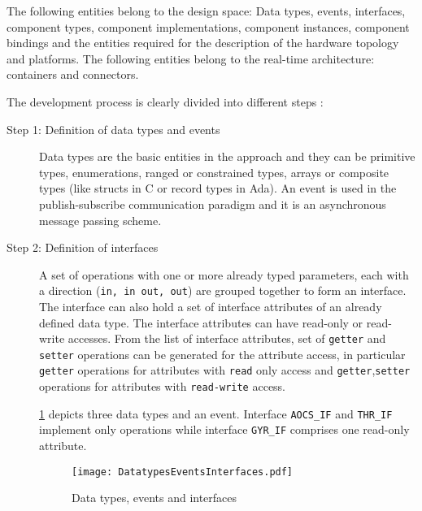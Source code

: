 The following entities belong to the design space: Data types, events, interfaces, component types, component implementations, component instances, component bindings and the entities required for the description of the hardware topology and platforms. The following entities belong to the real-time architecture: containers and connectors.

The development process is clearly divided into different steps \cite{CompBasedProcess}\cite{PhdThesis}\cite{SAVOIR}:

\begin{description}
\item [Step 1: Definition of data types and events] Data types are the basic entities in the approach and they can be primitive types, enumerations, ranged or constrained types, arrays or composite types (like structs in C or record types in Ada). An event is used in the publish-subscribe communication paradigm and it is an asynchronous message passing scheme. 

\item [Step 2: Definition of interfaces] A set of operations with one or more already typed parameters, each with a direction (\texttt{in, in out, out}) are grouped together to form an interface. The interface can also hold a set of interface attributes of an already defined data type. The interface attributes can have read-only or read-write accesses. From the list of interface attributes, set of \texttt{getter} and \texttt{setter} operations can be generated for the attribute access, in particular \texttt{getter} operations for attributes with \texttt{read} only access and \texttt{getter},\texttt{setter} operations for attributes with \texttt{read-write} access. 

\cref{fig: Datatypes events and interfaces} depicts three data types and an event. Interface \texttt{AOCS\_IF} and \texttt{THR\_IF} implement only operations while interface \texttt{GYR\_IF} comprises one read-only attribute.

\begin{figure}[h]
	\centering
	\texttt{[image: DatatypesEventsInterfaces.pdf]}
	\caption{Data types, events and interfaces}
	\label{fig: Datatypes events and interfaces}
\end{figure}


\end{description}
